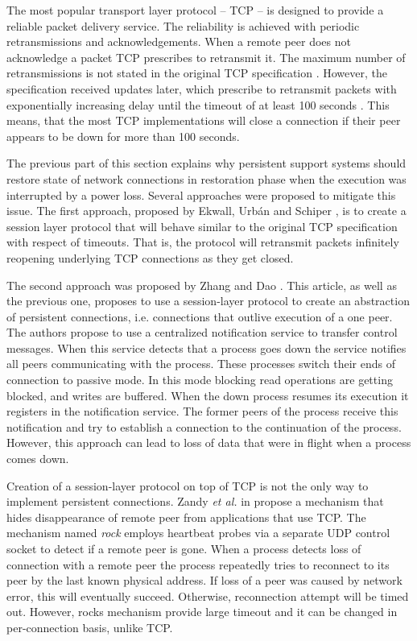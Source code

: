 The most popular transport layer protocol -- TCP -- is designed to provide a 
reliable packet delivery service. The reliability is achieved with periodic
retransmissions and acknowledgements. When a remote peer does not acknowledge a
packet TCP prescribes to retransmit it. The maximum number of retransmissions is
not stated in the original TCP specification \cite{john1981transmission}.
However, the specification received updates later, which prescribe to retransmit
packets with exponentially increasing delay \cite{rfc6298} until the timeout of
at least 100 seconds \cite{rfc1122}. This means, that the most TCP
implementations will close a connection if their peer appears to be down for
more than 100 seconds.

The previous part of this section explains why persistent support systems should
restore state of network connections in restoration phase when the execution was
interrupted by a power loss. Several approaches were proposed to mitigate this
issue. The first approach, proposed by Ekwall, Urb{\'a}n and Schiper
\cite{ekwall2002robust}, is to create a session layer protocol that will behave
similar to the original TCP specification with respect of timeouts. That is, the
protocol will retransmit packets infinitely reopening underlying TCP connections
as they get closed.

The second approach was proposed by Zhang and Dao \cite{zhang1995persistent}.
This article, as well as the previous one, proposes to use a session-layer
protocol to create an abstraction of persistent connections, i.e. connections
that outlive execution of a one peer. The authors propose to use a centralized
notification service to transfer control messages. When this service detects
that a process goes down the service notifies all peers communicating with the
process. These processes switch their ends of connection to passive mode. In
this mode blocking read operations are getting blocked, and writes are buffered.
When the down process resumes its execution it registers in the notification
service. The former peers of the process receive this notification and try to
establish a connection to the continuation of the process. However, this
approach can lead to loss of data that were in flight when a process comes down.

Creation of a session-layer protocol on top of TCP is not the only way to
implement persistent connections. Zandy \textit{et al.} in \cite{rocks_racks}
propose a mechanism that hides disappearance of remote peer from applications
that use TCP. The mechanism named \textit{rock} employs heartbeat probes via a
separate UDP control socket to detect if a remote peer is gone. When a process
detects loss of connection with a remote peer the process repeatedly tries to
reconnect to its peer by the last known physical address. If loss of a peer was
caused by network error, this will eventually succeed. Otherwise, reconnection
attempt will be timed out. However, rocks mechanism provide large timeout and it
can be changed in per-connection basis, unlike TCP. 

